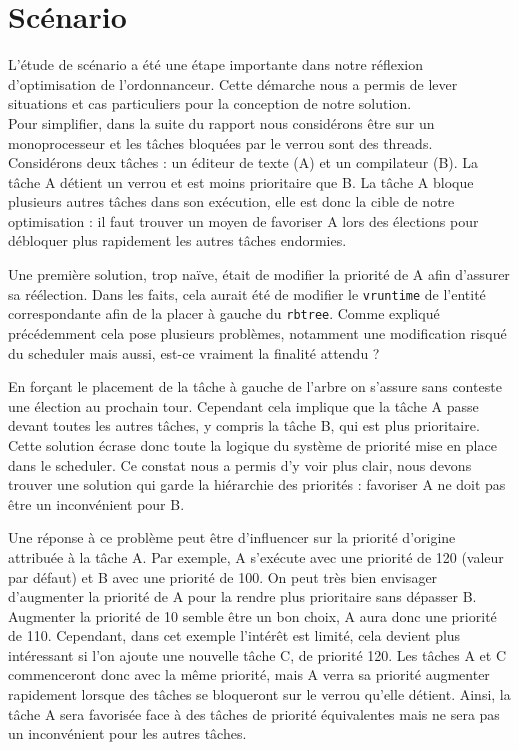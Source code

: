 \section*{Scénario}

L'étude de scénario a été une étape importante dans notre réflexion d'optimisation de l'ordonnanceur. Cette démarche nous a permis de lever situations et cas particuliers pour la conception de notre solution.
\\

Pour simplifier, dans la suite du rapport nous considérons être sur un monoprocesseur et les tâches bloquées par le verrou sont des threads.
\\

Considérons deux tâches : un éditeur de texte (A) et un compilateur (B). La tâche A détient un verrou et est moins prioritaire que B. La tâche A bloque plusieurs autres tâches dans son exécution, elle est donc la cible de notre optimisation : il faut trouver un moyen de favoriser A lors des élections pour débloquer plus rapidement les autres tâches endormies.

Une première solution, trop naïve, était de modifier la priorité de A afin d'assurer sa réélection. Dans les faits, cela aurait été de modifier le \verb|vruntime| de l'entité correspondante afin de la placer à gauche du \verb|rbtree|. Comme expliqué précédemment cela pose plusieurs problèmes, notamment une modification risqué du scheduler mais aussi, est-ce vraiment la finalité attendu ?

En forçant le placement de la tâche à gauche de l'arbre on s'assure sans conteste une élection au prochain tour. Cependant cela implique que la tâche A passe devant toutes les autres tâches, y compris la tâche B, qui est plus prioritaire. Cette solution écrase donc toute la logique du système de priorité mise en place dans le scheduler. Ce constat nous a permis d'y voir plus clair, nous devons trouver une solution qui garde la hiérarchie des priorités : favoriser A ne doit pas être un inconvénient pour B.

Une réponse à ce problème peut être d'influencer sur la priorité d'origine attribuée à la tâche A. Par exemple, A s'exécute avec une priorité de 120 (valeur par défaut) et B avec une priorité de 100. On peut très bien envisager d'augmenter la priorité de A pour la rendre plus prioritaire sans dépasser B. Augmenter la priorité de 10 semble être un bon choix, A aura donc une priorité de 110. Cependant, dans cet exemple l'intérêt est limité, cela devient plus intéressant si l'on ajoute une nouvelle tâche C, de priorité 120. Les tâches A et C commenceront donc avec la même priorité, mais A verra sa priorité augmenter rapidement lorsque des tâches se bloqueront sur le verrou qu'elle détient. Ainsi, la tâche A sera favorisée face à des tâches de priorité équivalentes mais ne sera pas un inconvénient pour les autres tâches.

